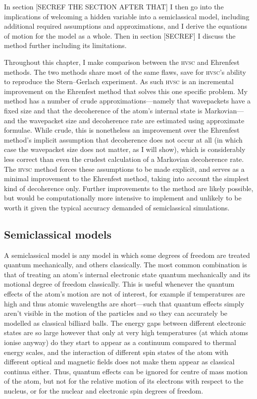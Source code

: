In section [SECREF THE SECTION AFTER THAT] I then go into the implications of welcoming a hidden variable into a semiclassical model, including additional required assumptions and approximations, and I derive the equations of motion for the model as a whole. Then in section [SECREF] I discuss the method further including its limitations.

Throughout this chapter, I make comparison between the \textsc{hvsc} and Ehrenfest methods. The two methods share most of the same flaws, save for \textsc{hvsc}'s ability to reproduce the Stern--Gerlach experiment. As such \textsc{hvsc} is an incremental improvement on the Ehrenfest method that solves this one specific problem. My method has a number of crude approximations---namely that wavepackets have a fixed size and that the decoherence of the atom's internal state is Markovian---and the wavepacket size and decoherence rate are estimated using approximate formulae. While crude, this is nonetheless an improvement over the Ehrenfest method's implicit assumption that decoherence does not occur at all (in which case the wavepacket size does not matter, as I will show), which is considerably less correct than even the crudest calculation of a Markovian decoherence rate. The \textsc{hvsc} method forces these assumptions to be made explicit, and serves as a minimal improvement to the Ehrenfest method, taking into account the simplest kind of decoherence only. Further improvements to the method are likely possible, but would be computationally more intensive to implement and unlikely to be worth it given the typical accuracy demanded of semiclassical simulations.


\subsection{Semiclassical models}

A semiclassical model is any model in which some degrees of freedom are treated quantum mechanically, and others classically. The most common combination is that of treating an atom's internal electronic state quantum mechanically and its motional degree of freedom classically. This is useful whenever the quantum effects of the atom's motion are not of interest, for example if temperatures are high and thus atomic wavelengths are short---such that quantum effects simply aren't visible in the motion of the particles and so they can accurately be modelled as classical billiard balls. The energy gaps between different electronic states are so large however that only at very high temperatures (at which atoms ionise anyway) do they start to appear as a continuum compared to thermal energy scales, and the interaction of different spin states of the atom with different optical and magnetic fields does not make them appear as classical continua either. Thus, quantum effects can be ignored for centre of mass motion of the atom, but not for the relative motion of its electrons with respect to the nucleus, or for the nuclear and electronic spin degrees of freedom.

